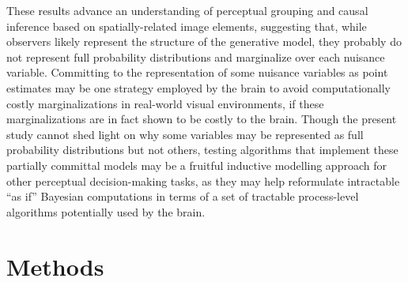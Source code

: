\documentclass{article}
\begin{document}

These results advance an understanding of perceptual grouping and causal inference based on spatially-related image elements, suggesting that, while observers likely represent the structure of the generative model, they probably do not represent full probability distributions and marginalize over each nuisance variable. Committing to the representation of some nuisance variables as point estimates may be one strategy employed by the brain to avoid computationally costly marginalizations in real-world visual environments, if these marginalizations are in fact shown to be costly to the brain. Though the present study cannot shed light on why some variables may be represented as full probability distributions but not others, testing algorithms that implement these partially committal models may be a fruitful inductive modelling approach for other perceptual decision-making tasks, as they may help reformulate intractable ``as if'' Bayesian computations in terms of a set of tractable process-level algorithms potentially used by the brain. 

\section*{Methods} \label{Methods}
\end{document}
